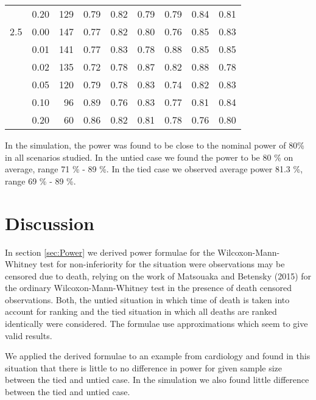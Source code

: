 \documentclass[bimj,fleqn]{w-art}\usepackage[]{graphicx}\usepackage[]{color}
\theoremstyle{plain}
\theoremstyle{definition}
\begin{document}
\begin{table}[ht]
\begin{tabular}{lrrrrrrrr}
    & 0.20 & 129 & 0.79 & 0.82 & 0.79 & 0.79 & 0.84 & 0.81 \\ 
  2.5 & 0.00 & 147 & 0.77 & 0.82 & 0.80 & 0.76 & 0.85 & 0.83 \\ 
    & 0.01 & 141 & 0.77 & 0.83 & 0.78 & 0.88 & 0.85 & 0.85 \\ 
    & 0.02 & 135 & 0.72 & 0.78 & 0.87 & 0.82 & 0.88 & 0.78 \\ 
    & 0.05 & 120 & 0.79 & 0.78 & 0.83 & 0.74 & 0.82 & 0.83 \\ 
    & 0.10 & 96 & 0.89 & 0.76 & 0.83 & 0.77 & 0.81 & 0.84 \\ 
    & 0.20 & 60 & 0.86 & 0.82 & 0.81 & 0.78 & 0.76 & 0.80 \\ 
   \hline
\end{tabular}
\end{table}


In the simulation, the power was found to be close to the nominal power of 80\%
in all scenarios studied. In the untied case we found the power to be
80 \% on average, range
71 \% - 89 \%.
In the tied case we observed average power
81.3 \%, range
69 \% - 89 \%.




\section{Discussion}
\label{sec:Discussion}
In section \ref{sec:Power} we derived power formulae for the Wilcoxon-Mann-Whitney
test for non-inferiority for the situation were observations may be censored due
to death, relying on the work of Matsouaka and Betensky (2015) for the ordinary
Wilcoxon-Mann-Whitney test in the presence of death censored observations. Both,
the untied situation in which time of death is taken into account for ranking and
the tied situation in which all deaths are ranked identically were considered.
The formulae use approximations which seem to give valid results.

We applied the derived formulae to an example from cardiology and found in this
situation that there is little to no difference in power for given sample size
between the tied and untied case. In the simulation we also found little
difference between the tied and untied case.
\end{document}
